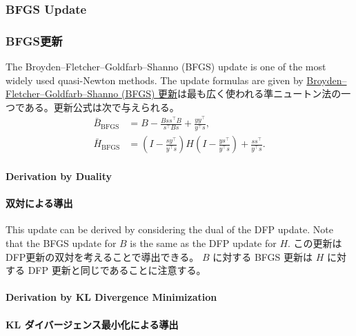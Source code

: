 \documentclass[0_main]{subfiles}
\begin{document}
\ifEn
    \subsubsection{BFGS Update}
\else
    \subsubsection{BFGS更新}
\fi

\ifEn
    The Broyden--Fletcher--Goldfarb--Shanno (BFGS) update is one of the most widely used quasi-Newton methods. The update formulas are given by
\else
    \href{https://en.wikipedia.org/wiki/Broyden%E2%80%93Fletcher%E2%80%93Goldfarb%E2%80%93Shanno_algorithm}{Broyden--Fletcher--Goldfarb--Shanno (BFGS) 更新}は最も広く使われる準ニュートン法の一つである。更新公式は次で与えられる。
\fi
\begin{align*}
    \bar{B}_{\mathrm{BFGS}} & = B - \frac{B s s^\top B}{s^\top B s} + \frac{y y^\top}{y^\top s},                                                     \\
    \bar{H}_{\mathrm{BFGS}} & = \left(I - \frac{s y^\top}{y^\top s}\right) H \left(I - \frac{y s^\top}{y^\top s}\right) + \frac{s s^\top}{y^\top s}.
\end{align*}

\ifEn
    \paragraph{Derivation by Duality}
\else
    \paragraph{双対による導出}
\fi

\ifEn
    This update can be derived by considering the dual of the DFP update.
    Note that the BFGS update for $B$ is the same as the DFP update for $H$.
\else
    この更新はDFP更新の双対を考えることで導出できる。
    $B$ に対する BFGS 更新は $H$ に対する DFP 更新と同じであることに注意する。
\fi

\ifEn
    \paragraph{Derivation by KL Divergence Minimization}
\else
    \paragraph{KL ダイバージェンス最小化による導出}
\fi
\end{document}
